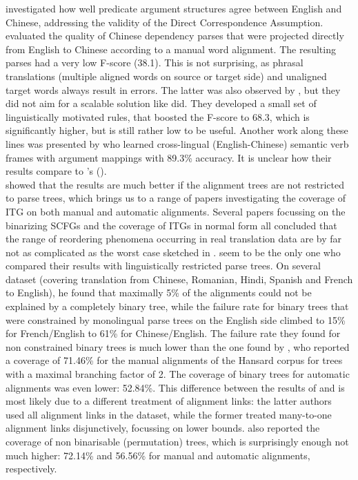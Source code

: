\documentclass[a4paper, 11pt]{report}
\theoremstyle{definition}
\theoremstyle{plain}
\def\citepos#1{\citeauthor{#1}'s (\citeyear{#1})}
\begin{document}
\cite{hwa2002evaluating} investigated how well predicate argument structures agree between English and Chinese, addressing the validity of the Direct Correspondence Assumption. \citeauthor{hwa2002evaluating} evaluated the quality of Chinese dependency parses that were projected directly from English to Chinese according to a manual word alignment. The resulting parses had a very low F-score (38.1). This is not surprising, as phrasal translations (multiple aligned words on source or target side) and unaligned target words always result in errors. The latter was also observed by \cite{hwa2002evaluating}, but they did not aim for a scalable solution like \cite{fox2002phrasal} did. They developed a small set of linguistically motivated rules, that boosted the F-score to 68.3, which is significantly higher, but is still rather low to be useful. Another work along these lines was presented by \cite{fung2006automatic} who learned cross-lingual (English-Chinese) semantic verb frames with argument mappings with 89.3\% accuracy. It is unclear how their results compare to \citepos{hwa2002evaluating}.\\
\cite{wellington2006empirical} showed that the results are much better if the alignment trees are not restricted to parse trees, which brings us to a range of papers investigating the coverage of ITG on both manual and automatic alignments. Several papers focussing on the binarizing SCFGs \citep{zhang2006synchronous,huang2009binarization} and the coverage of ITGs in normal form \citep{sogaard2009empirical1,sogaard2009empirical2,sogaard2010can} all concluded that the range of reordering phenomena occurring in real translation data are by far not as complicated as the worst case sketched in \cite{satta2005some}. \cite{wellington2006empirical} seem to be the only one who compared their results with linguistically restricted parse trees. On several dataset (covering translation from Chinese, Romanian, Hindi, Spanish and French to English), he found that maximally 5\% of the alignments could not be explained by a completely binary tree, while the failure rate for binary trees that were constrained by monolingual parse trees on the English side climbed to 15\% for French/English to 61\% for Chinese/English. The failure rate they found for non constrained binary trees is much lower than the one found by \cite{simaan2013hats}, who reported a coverage of 71.46\% for the manual alignments of the Hansard corpus for trees with a maximal branching factor of 2. The coverage of binary trees for automatic alignments was even lower: 52.84\%. This difference between the results of \cite{wellington2006empirical} and \cite{simaan2013hats} is most likely due to a different treatment of alignment links: the latter authors used all alignment links in the dataset, while the former treated many-to-one alignment links disjunctively, focussing on lower bounds. \cite{simaan2013hats} also reported the coverage of non binarisable (permutation) trees, which is surprisingly enough not much higher: 72.14\% and 56.56\% for manual and automatic alignments, respectively.
\end{document}
